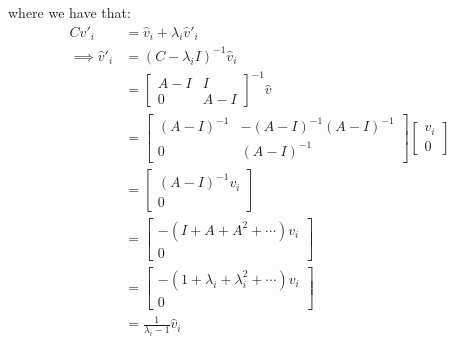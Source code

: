 \documentclass[12pt]{exam}
\begin{document}
\begin{questions}
\begin{solution}
\begin{enumerate}[label=(\alph*)]
\[        \]
        where we have that:
        \begin{align*}
          C\hat{v}'_i &= \hat{v}_i + \lambda_i \hat{v}'_i \\
          \implies \hat{v}'_i &= (C - \lambda_iI)^{-1}\hat{v}_i \\
          &= \begin{bmatrix} A-I & I \\ 0 & A-I \end{bmatrix}^{-1}\hat{v} \\
          &= \begin{bmatrix} (A-I)^{-1} & -(A-I)^{-1}(A-I)^{-1} \\ 0 & (A-I)^{-1} \end{bmatrix} \begin{bmatrix} v_i \\ 0 \end{bmatrix} \\
          &= \begin{bmatrix} (A-I)^{-1}v_i \\ 0 \end{bmatrix} \\
          &= \begin{bmatrix} -(I + A + A^2 + \cdots)v_i \\ 0 \end{bmatrix} \\
          &= \begin{bmatrix} -(1 + \lambda_i + \lambda_i^2 + \cdots)v_i \\ 0 \end{bmatrix} \\
          &= \frac{1}{\lambda_i - 1} \hat{v}_i
        \end{align*}
    \end{enumerate}
  \end{solution}


\end{questions}
\end{document}
